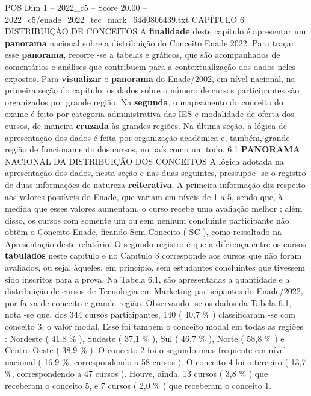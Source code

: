 \begin{textsample}{POS Dim 1 – 2022\_c5 – Score 20.00 – 2022\_c5/enade\_2022\_tec\_mark\_64d0806439.txt}  \label{ex:f1_pos_026}
CAPÍTULO 6 DISTRIBUIÇÃO DE CONCEITOS A \textbf{finalidade} deste capítulo é apresentar um \textbf{panorama} nacional sobre a distribuição do Conceito Enade 2022.
Para traçar esse \textbf{panorama}, recorre -se a tabelas e gráficos, que são acompanhados de comentários e análises que contribuem para a contextualização dos dados neles expostos.
Para \textbf{visualizar} o \textbf{panorama} do Enade/2002, em nível nacional, na primeira seção do capítulo, os dados sobre o número de cursos participantes são organizados por grande região.
Na \textbf{segunda}, o mapeamento do conceito do exame é feito por categoria administrativa das IES e modalidade de oferta dos cursos, de maneira \textbf{cruzada} às grandes regiões.
Na última seção, a lógica de apresentação dos dados é feita por organização acadêmica e, também, grande região de funcionamento dos cursos, no país como um todo. 6.1 \textbf{PANORAMA} NACIONAL DA DISTRIBUIÇÃO DOS CONCEITOS A lógica adotada na apresentação dos dados, nesta seção e nas duas seguintes, pressupõe -se o registro de duas informações de natureza \textbf{reiterativa}.
A primeira informação diz respeito aos valores possíveis do Enade, que variam em níveis de 1 a 5, sendo que, à medida que esses valores aumentam, o curso recebe uma avaliação melhor ; além disso, os cursos com somente um ou sem nenhum concluinte participante não obtêm o Conceito Enade, ficando Sem Conceito ( SC ), como ressaltado na Apresentação deste relatório.
O segundo registro é que a diferença entre os cursos \textbf{tabulados} neste capítulo e no Capítulo 3 corresponde aos cursos que não foram avaliados, ou seja, àqueles, em princípio, sem estudantes concluintes que tivessem sido inscritos para a prova.
Na Tabela 6.1, são apresentadas a quantidade e a distribuição de cursos de Tecnologia em Marketing participantes do Enade/2022, por faixa de conceito e grande região.
Observando -se os dados da Tabela 6.1, nota -se que, dos 344 cursos participantes, 140 ( 40,7 \% ) classificaram -se com conceito 3, o valor modal.
Esse foi também o conceito modal em todas as regiões : Nordeste ( 41,8 \% ), Sudeste ( 37,1 \% ), Sul ( 46,7 \% ), Norte ( 58,8 \% ) e Centro-Oeste ( 38,9 \% ).
O conceito 2 foi o segundo mais frequente em nível nacional ( 16,9 \%, correspondendo a 58 cursos ).
O conceito 4 foi o terceiro ( 13,7 \%, correspondendo a 47 cursos ).
Houve, ainda, 13 cursos ( 3,8 \% ) que receberam o conceito 5, e 7 cursos ( 2,0 \% ) que receberam o conceito 1.

\end{textsample}
